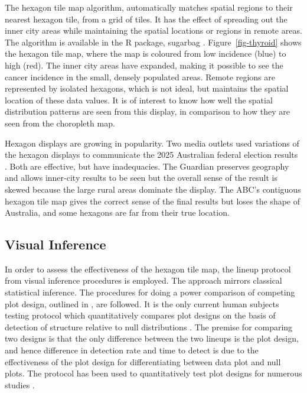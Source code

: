 \documentclass[
doublespace,
  times]{anzsauth}
\begin{document}
The hexagon tile map algorithm, automatically matches spatial regions to
their nearest hexagon tile, from a grid of tiles. It has the effect of
spreading out the inner city areas while maintaining the spatial
locations or regions in remote areas. The algorithm is available in the
\textsf{R} package, \textsf{sugarbag} \citep{sugarbag}.
Figure~\ref{fig-thyroid} shows the hexagon tile map, where the map is
coloured from low incidence (blue) to high (red). The inner city areas
have expanded, making it possible to see the cancer incidence in the
small, densely populated areas. Remote regions are represented by
isolated hexagons, which is not ideal, but maintains the spatial
location of these data values. It is of interest to know how well the
spatial distribution patterns are seen from this display, in comparison
to how they are seen from the choropleth map.

Hexagon displays are growing in popularity. Two media outlets used
variations of the hexagon displays to communicate the 2025 Australian
federal election results
\citep{abc-election2025, guardian-election2025}. Both are effective, but
have inadequacies. The Guardian preserves geography and allows
inner-city results to be seen but the overall sense of the result is
skewed because the large rural areas dominate the display. The ABC's
contiguous hexagon tile map gives the correct sense of the final results
but loses the shape of Australia, and some hexagons are far from their
true location.

\subsection{Visual Inference}\label{visual-inference}

In order to assess the effectiveness of the hexagon tile map, the lineup
protocol \citep{BCHLLSW09, GIIV} from visual inference procedures is
employed. The approach mirrors classical statistical inference. The
procedures for doing a power comparison of competing plot design,
outlined in \citet{GTPCCD}, are followed. It is the only current human
subjects testing protocol which quantitatively compares plot designs on
the basis of detection of structure relative to null distributions
\citep{VCH, VanderPlas2021Designing}. The premise for comparing two
designs is that the only difference between the two lineups is the plot
design, and hence difference in detection rate and time to detect is due
to the effectiveness of the plot design for differentiating between data
plot and null plots. The protocol has been used to quantitatively test
plot designs for numerous studies
\citep[e.g.][]{LHC, VH2016, KTV, RS2021}.
\end{document}
